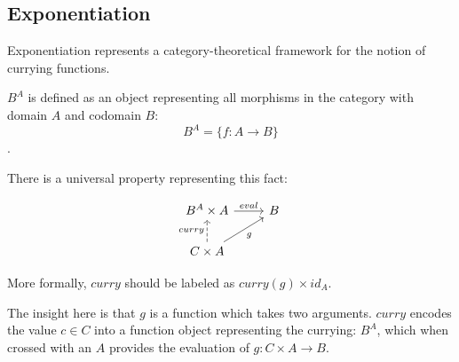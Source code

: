 \documentclass[]{article}
\begin{document}
\subsection{Exponentiation}

Exponentiation represents a category-theoretical framework for the notion of currying functions.

$B^A$ is defined as an object representing all morphisms in the category with domain $A$ and codomain $B$:
$$B^A = \{f: A \to B\}$$.

There is a universal property representing this fact: 

$$\begin{tikzcd}
B^A \times A \arrow{r}{eval} & B \\
C \times A \arrow[dashed]{u}{curry} \arrow[swap]{ur}{g} &
\end{tikzcd}$$

More formally, $\mathit{curry}$ should be labeled as $\mathit{curry}(g) \times \mathit{id}_A$.

The insight here is that $g$ is a function which takes two arguments. $\mathit{curry}$ encodes the value $c \in C$ into a function object representing the currying: $B^A$, which when crossed with an $A$ provides the evaluation of $g: C\times A \to B$.
\end{document}
